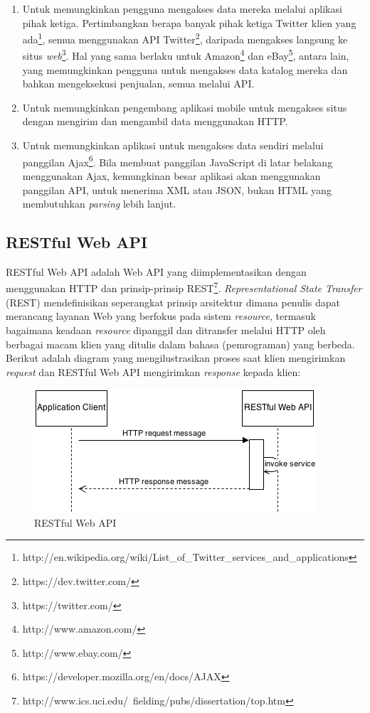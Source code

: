 \documentclass[a4paper, 12pt, oneside]{report}
\begin{document}
\begin{enumerate}
  \item Untuk memungkinkan pengguna mengakses data mereka melalui aplikasi pihak ketiga. Pertimbangkan berapa banyak pihak ketiga Twitter klien yang ada\footnote{http://en.wikipedia.org/wiki/List\_of\_Twitter\_services\_and\_applications}, semua menggunakan API Twitter\footnote{https://dev.twitter.com/}, daripada mengakses langsung ke situs \textit{web}\footnote{https://twitter.com/}. Hal yang sama berlaku untuk Amazon\footnote{http://www.amazon.com/} dan eBay\footnote{http://www.ebay.com/}, antara lain, yang memungkinkan pengguna untuk mengakses data katalog mereka dan bahkan mengeksekusi penjualan, semua melalui API.
  \item Untuk memungkinkan pengembang aplikasi mobile untuk mengakses situs dengan mengirim dan mengambil data menggunakan HTTP.
  \item Untuk memungkinkan aplikasi untuk mengakses data sendiri melalui panggilan Ajax\footnote{https://developer.mozilla.org/en/docs/AJAX}. Bila membuat panggilan JavaScript di latar belakang menggunakan Ajax, kemungkinan besar aplikasi akan menggunakan panggilan API, untuk menerima XML atau JSON, bukan HTML yang membutuhkan \textit{parsing} lebih lanjut.
\end{enumerate}

\subsection{RESTful Web API}

\onehalfspacing RESTful Web API adalah Web API yang diimplementasikan dengan menggunakan HTTP dan prinsip-prinsip REST\footnote{http://www.ics.uci.edu/~fielding/pubs/dissertation/top.htm}. \textit{Representational State Transfer} (REST) mendefinisikan seperangkat prinsip arsitektur dimana penulis dapat merancang layanan Web yang berfokus pada sistem \textit{resource}, termasuk bagaimana keadaan \textit{resource} dipanggil dan ditransfer melalui HTTP oleh berbagai macam klien yang ditulis dalam bahasa (pemrograman) yang berbeda. Berikut adalah diagram yang mengilustrasikan proses saat klien mengirimkan \textit{request} dan RESTful Web API mengirimkan \textit{response} kepada klien:

\onehalfspacing
\begin{figure}[htp]
\centering
\includegraphics[scale=1.00]{images/RESTful-web-api.png}
\caption{RESTful Web API}
\label{RESTful Web API}
\end{figure}
\end{document}
